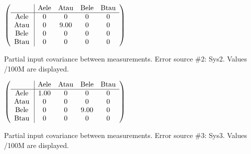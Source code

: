 \begin{table}[H]
\scriptsize
\begin{center}
\renewcommand{\arraystretch}{1.1}
\begin{math}\left(\begin{array}{c|cccc}
 & \mathrm{Aele} & 
\mathrm{Atau} & 
\mathrm{Bele} & 
\mathrm{Btau} \\
\hline
\mathrm{Aele} \hspace*{2pt} &  0 &  0 &  0 &  0 \\
\mathrm{Atau} \hspace*{2pt} &  0 &       9.00 &  0 &  0 \\
\mathrm{Bele} \hspace*{2pt} &  0 &  0 &  0 &  0 \\
\mathrm{Btau} \hspace*{2pt} &  0 &  0 &  0 &  0 \\
\end{array}\right)\end{math}
\caption{Partial input covariance between measurements. Error source \#2: Sys2. Values /100M are displayed.}
\renewcommand{\arraystretch}{1}
\end{center}
\end{table}
\begin{table}[H]
\scriptsize
\begin{center}
\renewcommand{\arraystretch}{1.1}
\begin{math}\left(\begin{array}{c|cccc}
 & \mathrm{Aele} & 
\mathrm{Atau} & 
\mathrm{Bele} & 
\mathrm{Btau} \\
\hline
\mathrm{Aele} \hspace*{2pt} &       1.00 &  0 &  0 &  0 \\
\mathrm{Atau} \hspace*{2pt} &  0 &  0 &  0 &  0 \\
\mathrm{Bele} \hspace*{2pt} &  0 &  0 &       9.00 &  0 \\
\mathrm{Btau} \hspace*{2pt} &  0 &  0 &  0 &  0 \\
\end{array}\right)\end{math}
\caption{Partial input covariance between measurements. Error source \#3: Sys3. Values /100M are displayed.}
\renewcommand{\arraystretch}{1}
\end{center}
\end{table}

